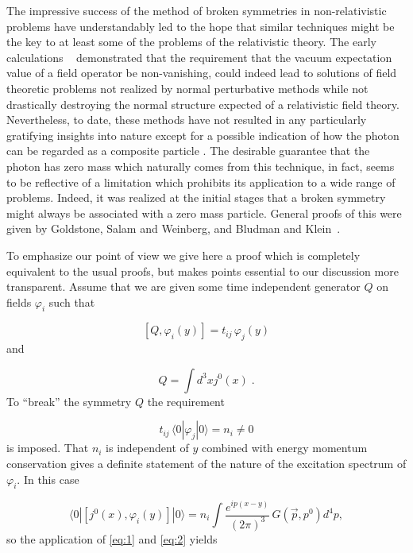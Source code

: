 \documentclass[%
  12pt,
  paper=letter,
  abstracton,
  pagesize=auto,
  version=last,
  DIV=calc
  ]{scrartcl}
\begin{document}
The impressive success of the method of broken symmetries in
non-relativistic problems have understandably led to the hope that
similar techniques might be the key to at least some of the problems
of the relativistic theory.  The early calculations \cite{1}~\cite {2}
demonstrated that the requirement that the vacuum expectation value of
a field operator be non-vanishing, could indeed lead to solutions of
field theoretic problems not realized by normal perturbative methods
while not drastically destroying the normal structure expected of a
relativistic field theory.  Nevertheless, to date, these methods have
not resulted in any particularly gratifying insights into nature
except for a possible indication of how the photon can be regarded as
a composite particle \cite{3}.  The desirable guarantee that the
photon has zero mass which naturally comes from this technique, in
fact, seems to be reflective of a limitation which prohibits its
application to a wide range of problems.  Indeed, it was realized at
the initial stages that a broken symmetry might always be associated
with a zero mass particle.  General proofs of this were given by
Goldstone, Salam and Weinberg, and Bludman and Klein~\cite{4}.

To emphasize our point of view we give here a proof which is
completely equivalent to the usual proofs, but makes points essential to
our discussion more transparent.  Assume that we are given some time
independent generator $Q$ on fields $\varphi_i$ such that

\begin{equation}
\label{eq:1}
\left[Q, \varphi_{i}(y)\right] = t_{ij}\, \varphi_{j}(y)
\end{equation}
and

\begin{equation}
  \label{eq:2}
  Q = \int d^{3}x j^{0}(x) \; .
\end{equation}
To ``break'' the symmetry $Q$ the requirement

\begin{equation*}
t_{ij} \, \langle 0|\varphi_{j}|0\rangle = n_{i} \neq 0
\end{equation*}
is imposed. That $n_i$ is independent of $y$ combined with
energy momentum conservation gives a definite statement of the nature
of the excitation spectrum of $\varphi_i$. In this case

\begin{equation*}
  \langle 0| \left[j^{0}(x), \varphi_{i}(y)\right] |0\rangle =
    n_{i}\int \frac{e^{ip(x-y)}}{(2\pi)^3}\, G(\vec{p}, p^{0}) d^{4}p,
\end{equation*}
so the application of \eqref{eq:1} and \eqref{eq:2} yields
\end{document}
